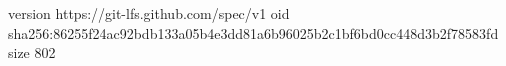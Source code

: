version https://git-lfs.github.com/spec/v1
oid sha256:86255f24ac92bdb133a05b4e3dd81a6b96025b2c1bf6bd0cc448d3b2f78583fd
size 802
